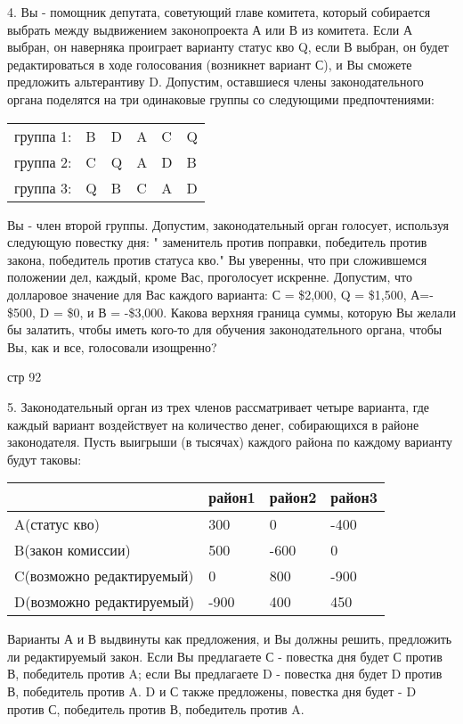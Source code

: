 \documentclass[a4paper,12pt]{article}
\begin{document}
4. Вы - помощник депутата, советующий главе
комитета, который собирается выбрать между
выдвижением законопроекта А или В из комитета. Если
А выбран, он наверняка проиграет варианту статус
кво Q, если В выбран, он будет редактироваться в
ходе голосования (возникнет вариант С), и Вы
сможете предложить альтерантиву D. Допустим,
оставшиеся члены законодательного органа поделятся
на три одинаковые группы со следующими
предпочтениями:

\begin{tabular}{llllll}
группа 1: & B & D & A & C & Q \\ группа 2: & C & Q & A & D & B \\
группа 3: & Q & B & C & A & D\end{tabular}

Вы - член второй группы. Допустим, законодательный
орган голосует, используя следующую повестку дня: "
заменитель против поправки, победитель против
закона, победитель против статуса кво." Вы
уверенны, что при сложившемся положении дел,
каждый, кроме Вас, проголосует искренне. Допустим,
что долларовое значение для Вас каждого варианта: С
= \$2,000, Q = \$1,500, А=- \$500, D = \$0, и В =
-\$3,000. Какова верхняя граница суммы, которую Вы
желали бы залатить, чтобы иметь кого-то для
обучения законодательного органа, чтобы Вы, как и
все, голосовали изощренно?

стр 92

5. Законодательный орган из трех членов
рассматривает четыре варианта, где каждый вариант
воздействует на количество денег, собирающихся в
районе законодателя. Пусть выигрыши (в тысячах)
каждого района по каждому варианту будут таковы:

\begin{tabular}{l|lll|}
\cline{2-4} & район1 & \multicolumn{1}{|l}{район2}
& \multicolumn{1}{|l|}{район3} \\ \hline
\multicolumn{1}{|l|}{A(статус кво)} & 300 & 0 & -400 \\
\multicolumn{1}{|l|}{B(закон комиссии)} & 500 & -600 & 0 \\
\multicolumn{1}{|l|}{C(возможно редактируемый)} & 0 & 800 & -900 \\
\multicolumn{1}{|l|}{D(возможно редактируемый)} &
-900 & 400 & 450 \\ \hline
\end{tabular}

Варианты А и В выдвинуты как предложения, и Вы
должны решить, предложить ли редактируемый закон.
Если Вы предлагаете С - повестка дня будет С против
В, победитель против A; если Вы предлагаете D -
повестка дня будет D против В, победитель против A.
D и С также предложены, повестка дня будет - D
против С, победитель против В, победитель против A.
\end{document}
